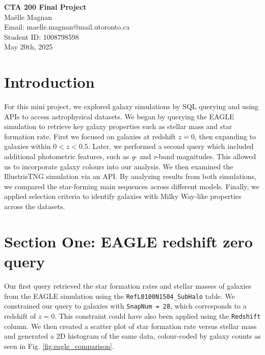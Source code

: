 \documentclass[10pt]{article}
\begin{document}
\begin{titlepage}
    \centering
    {\Huge \textbf{CTA 200 Final Project}} \\[2cm] %
    
    {\large Maëlle Magnan} \\[0.5cm] %
    Email: maelle.magnan@mail.utoronto.ca \\[0.5cm] %
    Student ID: 1008798598 \\[2cm] %

    {\large May 20th, 2025} \\[3cm] %

\end{titlepage}


\section*{Introduction}
For this mini project, we explored galaxy simulations by SQL querying and using APIs to access astrophysical datasets. We began by querying the EAGLE simulation to retrieve key galaxy properties such as stellar mass and star formation rate. First we focused on galaxies at redshift \( z = 0 \), then expanding to galaxies within \( 0 < z < 0.5 \). Later, we performed a second query which included additional photometric features, such as \textit{g}- and \textit{r}-band magnitudes. This allowed us to incorporate galaxy colours into our analysis. We then examined the IllustrisTNG simulation via an API. By analyzing results from both simulations, we compared the star-forming main sequences across different models. Finally, we applied selection criteria to identify galaxies with Milky Way-like properties across the datasets.



\section*{Section One: EAGLE redshift zero query}

Our first query retrieved the star formation rates and stellar masses of galaxies from the EAGLE simulation using the \texttt{RefL0100N1504\_SubHalo} table. We constrained our query to galaxies with \texttt{SnapNum = 28}, which corresponds to a redshift of \( z = 0 \). This constraint could have also been applied using the \texttt{Redshift} column. We then created a scatter plot of star formation rate versus stellar mass and generated a 2D histogram of the same data, colour-coded by galaxy counts as seen in Fig. \ref{fig:eagle_comparison}.
\end{document}
